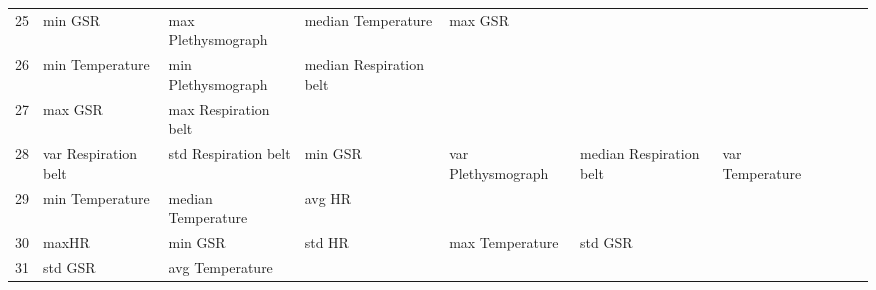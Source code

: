 \begin{landscape}
\begin{table}[]
\begin{tabular}{l|llllllll}
25       & min GSR                 & max Plethysmograph      & median Temperature      & max GSR                 &                         &                       &                         &                         &                         &         \\
26       & min Temperature         & min Plethysmograph      & median Respiration belt &                         &                         &                       &                         &                         &                         &         \\
27       & max GSR                 & max Respiration belt    &                         &                         &                         &                       &                         &                         &                         &         \\
28       & var Respiration belt    & std Respiration belt    & min GSR                 & var Plethysmograph      & median Respiration belt & var Temperature       &                         &                         &                         &         \\
29       & min Temperature         & median Temperature      & avg HR                  &                         &                         &                       &                         &                         &                         &         \\
30       & maxHR                   & min GSR                 & std HR                  & max Temperature         & std GSR                 &                       &                         &                         &                         &         \\
31       & std GSR                 & avg Temperature         &                         &                         &                         &                       &                         &                         &                         &         \\
\end{tabular}
\end{table}
\end{landscape}
\clearpage
